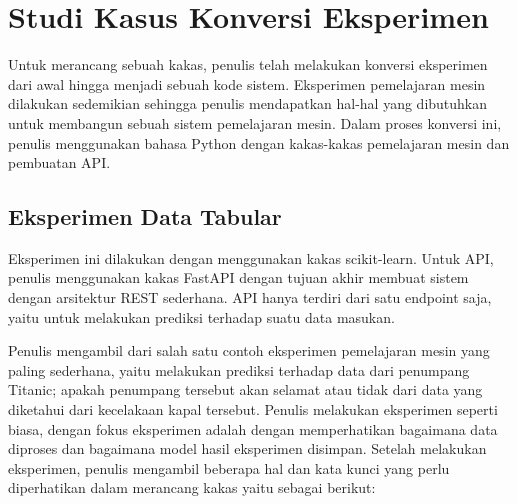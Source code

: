 \section{Studi Kasus Konversi Eksperimen}

Untuk merancang sebuah kakas, penulis telah melakukan konversi eksperimen dari awal hingga menjadi sebuah kode sistem.
Eksperimen pemelajaran mesin dilakukan sedemikian sehingga penulis mendapatkan hal-hal yang dibutuhkan untuk membangun sebuah sistem pemelajaran mesin.
Dalam proses konversi ini, penulis menggunakan bahasa Python dengan kakas-kakas pemelajaran mesin dan pembuatan API.

\subsection{Eksperimen Data Tabular}
Eksperimen ini dilakukan dengan menggunakan kakas scikit-learn.
Untuk API, penulis menggunakan kakas FastAPI dengan tujuan akhir membuat sistem dengan arsitektur REST sederhana.
API hanya terdiri dari satu endpoint saja, yaitu untuk melakukan prediksi terhadap suatu data masukan.

Penulis mengambil dari salah satu contoh eksperimen pemelajaran mesin yang paling sederhana, yaitu melakukan prediksi terhadap data dari penumpang Titanic; apakah penumpang tersebut akan selamat atau tidak dari data yang diketahui dari kecelakaan kapal tersebut.
Penulis melakukan eksperimen seperti biasa, dengan fokus eksperimen adalah dengan memperhatikan bagaimana data diproses dan bagaimana model hasil eksperimen disimpan.
Setelah melakukan eksperimen, penulis mengambil beberapa hal dan kata kunci yang perlu diperhatikan dalam merancang kakas yaitu sebagai berikut:

